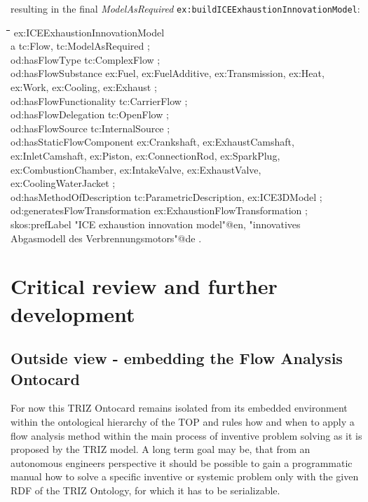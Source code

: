 \documentclass[a4paper,11pt]{article}
\newenvironment{code}{\tt \begin{tabbing}
\hskip12pt\=\hskip12pt\=\hskip12pt\=\hskip12pt\=\hskip5cm\=\hskip5cm\=\kill}
{\end{tabbing}}
\begin{document}
\begin{itemize}
    resulting in the final \emph{ModelAsRequired} 
    \texttt{ex:buildICEExhaustionInnovationModel}:
    \begin{code}
    ex:ICEExhaustionInnovationModel \\
    \> a tc:Flow, tc:ModelAsRequired ; \\
    \> od:hasFlowType tc:ComplexFlow ; \\
    \> od:hasFlowSubstance ex:Fuel, ex:FuelAdditive, ex:Transmission, ex:Heat,  \\
    \> ex:Work, ex:Cooling, ex:Exhaust ; \\
    \> od:hasFlowFunctionality tc:CarrierFlow ; \\
    \> od:hasFlowDelegation tc:OpenFlow ; \\
    \> od:hasFlowSource tc:InternalSource ; \\
    \> od:hasStaticFlowComponent ex:Crankshaft, ex:ExhaustCamshaft,  \\
    \> ex:InletCamshaft, ex:Piston, ex:ConnectionRod, ex:SparkPlug,  \\
    \> ex:CombustionChamber, ex:IntakeValve, ex:ExhaustValve, \\
    \> ex:CoolingWaterJacket ; \\
    \> od:hasMethodOfDescription tc:ParametricDescription, ex:ICE3DModel ; \\
    \> od:generatesFlowTransformation ex:ExhaustionFlowTransformation ; \\
    \> skos:prefLabel "ICE exhaustion innovation model"@en, "innovatives  \\
    \> Abgasmodell des Verbrennungsmotors"@de . \\
    \end{code}
    \newpage
    \section{Critical review and further development}
        \subsection{Outside view - embedding the Flow Analysis Ontocard}
        For now this TRIZ Ontocard remains isolated from its embedded environment within the ontological hierarchy of the TOP and rules how and when to 
        apply a flow analysis method within the main process of inventive problem solving as it is proposed by the TRIZ model. A long term goal may be,
        that from an autonomous engineers perspective it should be possible to gain a programmatic manual how to solve a specific inventive or systemic
        problem only with the given RDF of the TRIZ Ontology, for which it has to be serializable.


\end{itemize}
\end{document}
